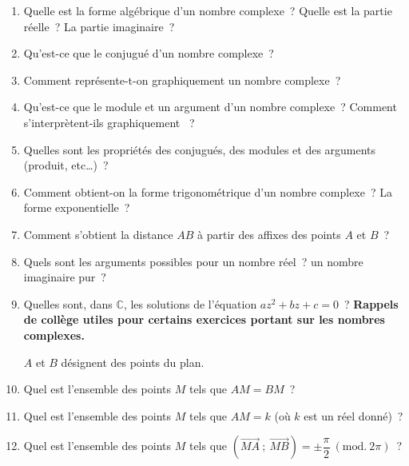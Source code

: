 
%
\begin{enumerate}
     \item %
     Quelle est la forme algébrique d'un nombre complexe~? Quelle est la partie réelle~? La partie imaginaire~?
     \item %
     Qu'est-ce que le conjugué d'un nombre complexe~?
     \item %
     Comment représente-t-on graphiquement un nombre complexe~?
     \item %
     Qu'est-ce que le module et un argument d'un nombre complexe~? Comment s'interprètent-ils graphiquement ~?
     \item %
     Quelles sont les propriétés des conjugués, des modules et des arguments (produit, etc…)~?
     \item %
     Comment obtient-on  la forme trigonométrique d'un nombre complexe~? La forme exponentielle~?
     \item %
     Comment s'obtient la distance $AB$ à partir des affixes des points $A$ et $B$~?
     \item %
     Quels sont les arguments possibles pour un nombre réel~? un nombre imaginaire pur~?
     \item %
     Quelles sont, dans $\mathbb{C}$,  les solutions de l'équation $az^2+bz+c=0$~?
     \bigskip
     \textbf{Rappels de collège utiles pour certains exercices portant sur les nombres complexes.}
     \par
     $A$ et $B$ désignent des points du plan.
     \item %
     Quel est l'ensemble des points $M$ tels que $AM=BM$~?
     \item %
     Quel est l'ensemble des points $M$ tels que $AM=k $ (où $k$ est un réel donné)~?
     \item %
     Quel est l'ensemble des points $M$ tels que $(\overrightarrow{MA}~;~\overrightarrow{MB})=\pm \dfrac{\pi}{2}~(\text{mod.}~2\pi)$~?
\end{enumerate}
